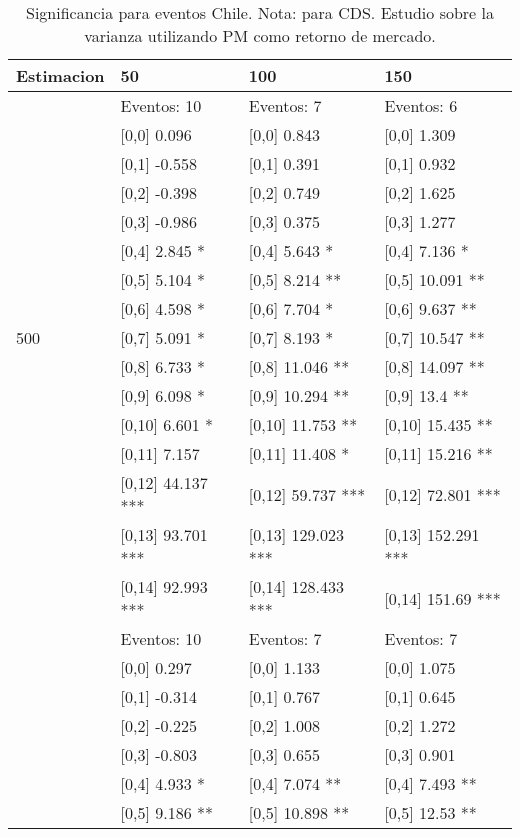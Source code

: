 \begin{table}

\caption{Significancia para eventos Chile. Nota: para CDS. Estudio sobre la varianza utilizando PM como retorno de mercado.}
\centering
\begin{tabular}[t]{llll}
\toprule
Estimacion & 50 & 100 & 150\\
\midrule
 & Eventos:  10 & Eventos:  7 & Eventos:  6\\
 & {}[0,0] 0.096 & {}[0,0] 0.843 & {}[0,0] 1.309\\
 & {}[0,1] -0.558 & {}[0,1] 0.391 & {}[0,1] 0.932\\
 & {}[0,2] -0.398 & {}[0,2] 0.749 & {}[0,2] 1.625\\
 & {}[0,3] -0.986 & {}[0,3] 0.375 & {}[0,3] 1.277\\
\addlinespace
 & {}[0,4] 2.845 * & {}[0,4] 5.643 * & {}[0,4] 7.136 *\\
 & {}[0,5] 5.104 * & {}[0,5] 8.214 ** & {}[0,5] 10.091 **\\
 & {}[0,6] 4.598 * & {}[0,6] 7.704 * & {}[0,6] 9.637 **\\
500 & {}[0,7] 5.091 * & {}[0,7] 8.193 * & {}[0,7] 10.547 **\\
 & {}[0,8] 6.733 * & {}[0,8] 11.046 ** & {}[0,8] 14.097 **\\
\addlinespace
 & {}[0,9] 6.098 * & {}[0,9] 10.294 ** & {}[0,9] 13.4 **\\
 & {}[0,10] 6.601 * & {}[0,10] 11.753 ** & {}[0,10] 15.435 **\\
 & {}[0,11] 7.157 & {}[0,11] 11.408 * & {}[0,11] 15.216 **\\
 & {}[0,12] 44.137 *** & {}[0,12] 59.737 *** & {}[0,12] 72.801 ***\\
 & {}[0,13] 93.701 *** & {}[0,13] 129.023 *** & {}[0,13] 152.291 ***\\
\addlinespace
 & {}[0,14] 92.993 *** & {}[0,14] 128.433 *** & {}[0,14] 151.69 ***\\
 & Eventos:  10 & Eventos:  7 & Eventos:  7\\
 & {}[0,0] 0.297 & {}[0,0] 1.133 & {}[0,0] 1.075\\
 & {}[0,1] -0.314 & {}[0,1] 0.767 & {}[0,1] 0.645\\
 & {}[0,2] -0.225 & {}[0,2] 1.008 & {}[0,2] 1.272\\
\addlinespace
 & {}[0,3] -0.803 & {}[0,3] 0.655 & {}[0,3] 0.901\\
 & {}[0,4] 4.933 * & {}[0,4] 7.074 ** & {}[0,4] 7.493 **\\
 & {}[0,5] 9.186 ** & {}[0,5] 10.898 ** & {}[0,5] 12.53 **\\

\end{tabular}
\end{table}

